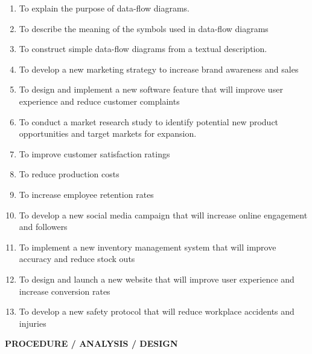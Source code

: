 \documentclass[a4paper,11pt]{article}
\begin{document}
\begin{center}
\begin{center}
\vspace{0.5cm}
 \begin{enumerate}
    \item To explain the purpose of data-flow diagrams. \\
    \item To describe the meaning of the symbols used in data-flow diagrams    \\
    \item To construct simple data-flow diagrams from a textual description.  \\ 
     \item  To develop a new marketing strategy to increase brand awareness and sales  \\
     \item  To design and implement a new software feature that will improve user experience and reduce customer complaints \\
     \item To conduct a market research study to identify potential new product opportunities and target markets for expansion.\\
     \item To improve customer satisfaction ratings  \\
     \item To reduce production costs\\
     \item To increase employee retention rates \\
     \item To develop a new social media campaign that will increase online engagement and followers  \\
     \item To implement a new inventory management system that will improve accuracy and reduce stock outs \\
     \item To design and launch a new website that will improve user experience and increase conversion rates  \\
     \item  To develop a new safety protocol that will reduce workplace accidents and injuries \\
 \end{enumerate}

\end{center}
\newpage


\begin{center}
    \textbf{\Large PROCEDURE / ANALYSIS / DESIGN }
    \vspace{0.5cm} 
\end{center}


\end{center}
\end{document}
